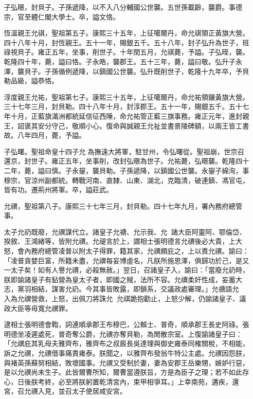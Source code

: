 \begin{pinyinscope}
子弘暻，封貝子。子孫遞降，以不入八分輔國公世襲。五世孫載齡，襲爵。事德宗，官至體仁閣大學士。卒，謚文恪。

恆溫親王允祺，聖祖第五子。康熙三十五年，上征噶爾丹，命允祺領正黃旗大營。四十八年十月，封恆親王。五十一年，賜銀五千。五十八年，封子弘升為世子，班祿視貝子。雍正五年，坐事，削世子。十年閏五月，允祺薨，予謚。子弘晊，襲。乾隆四十年，薨，謚曰恪。子永皓，襲郡王。五十三年，薨，謚曰敬。弘升子永澤，襲貝子。子孫循例遞降，以鎮國公世襲。弘升既削世子，乾隆十九年卒，予貝勒品級，謚恭恪。

淳度親王允祐，聖祖第七子。康熙三十五年，上征噶爾丹，命允祐領鑲黃旗大營。三十七年三月，封貝勒。四十八年十月，封淳郡王。五十一年，賜銀五千。五十七年十月，正藍旗滿洲都統延信征西陲，命允祐管正藍三旗事務。雍正元年，進封親王，詔褒其安分守己，敬順小心。復命與誠親王允祉並書景陵碑額，以兩王皆工書故。八年四月，薨，予謚。

子弘曙。聖祖命皇十四子允為撫遠大將軍，駐甘州，令弘曙從。聖祖崩，世宗召還京，封世子。雍正五年，坐事削，改封弘暻為世子。允祐薨，弘暻襲。乾隆四十二年，薨，謚曰慎。子永鋆，襲貝勒。子孫遞降，以鎮國公世襲。永鋆子綿洵，事穆宗，官涼州副都統。轉戰河南、直隸、山東、湖北，克臨清，破連鎮、馮官屯，皆有功。遷荊州將軍。卒，謚莊武。

允禩，聖祖第八子。康熙三十七年三月，封貝勒。四十七年九月，署內務府總管事。

太子允礽既廢，允禩謀代立。諸皇子允禟、允示我、允，諸大臣阿靈阿、鄂倫岱、揆敘、王鴻緒等，皆附允禩。允禔言於上，謂相士張明德言允禩後必大貴，上大怒，會內務府總管凌普以附太子得罪，籍其家，允禩頗庇之，上以責允禩。諭曰：「凌普貪婪巨富，所籍未盡，允禩每妄博虛名，凡朕所施恩澤，俱歸功於己，是又一太子矣！如有人譽允禩，必殺無赦。」翌日，召諸皇子入，諭曰：「當廢允礽時，朕即諭諸皇子有鉆營為皇太子者，即國之賊，法所不容。允禩柔奸性成，妄蓄大志，黨羽相結，謀害允礽。今其事皆敗露，即鎖系，交議政處審理。」允禟語允，入為允禩營救，上怒，出佩刀將誅允；允祺跪抱勸止，上怒少解，仍諭諸皇子、議政大臣等毋寬允禩罪。

逮相士張明德會鞫，詞連順承郡王布穆巴，公賴士、普奇，順承郡王長史阿祿。張明德坐凌遲處死，普奇奪公爵，允禩亦奪貝勒，為閒散宗室。上復諭諸皇子曰：「允禩庇其乳母夫雅齊布，雅齊布之叔廄長吳達理與御史雍泰同榷關稅，不相能，訴之允禩，允禩借事痛責雍泰。朕聞之，以雅齊布發翁牛特公主處。允禩因怨朕，與褚英孫蘇努相結，敗壞國事。允禩又受制於妻，妻為安郡王岳樂甥，嫉妒行惡，是以允禩尚未生子。此皆爾曹所知，爾曹當遵朕旨，方是為臣子之理；若不如此存心，日後朕考終，必至將朕躬置乾清宮內，束甲相爭耳。」上幸南苑，遘疾，還宮，召允禩入見，並召太子使居咸安宮。


\end{pinyinscope}
